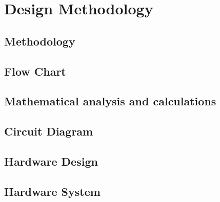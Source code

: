  \chapter{Design Methodology}
        \section{Methodology}
        \section{Flow Chart}
        \section{Mathematical analysis and calculations}
        
        	
       	
        \section{Circuit Diagram}
        \section{Hardware Design}
        \section{Hardware System}
   